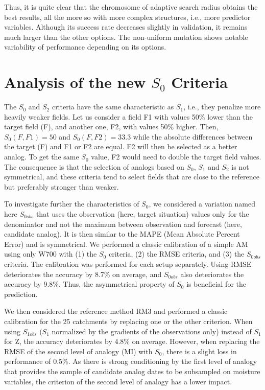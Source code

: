 \documentclass[draft]{agujournal2019}
\begin{document}
Thus, it is quite clear that the chromosome of adaptive search radius obtains the best results, all the more so with more complex structures, i.e., more predictor variables. Although its success rate decreases slightly in validation, it remains much larger than the other options. The non-uniform mutation shows notable variability of performance depending on its options.

\FloatBarrier

\section{Analysis of the new $S_{0}$ Criteria}

The $S_{0}$ and $S_{2}$ criteria have the same characteristic as $S_{1}$, i.e., they penalize more heavily weaker fields. Let us consider a field F1 with values 50\% lower than the target field (F), and another one, F2, with values 50\% higher. Then, $S_{0}(F, F1) = 50$ and $S_{0}(F, F2) = 33.3$ while the absolute differences between the target (F) and F1 or F2 are equal. F2 will then be selected as a better analog. To get the same $S_{0}$ value, F2 would need to double the target field values. The consequence is that the selection of analogs based on $S_{0}$, $S_{1}$ and $S_{2}$ is not symmetrical, and these criteria tend to select fields that are close to the reference but preferably stronger than weaker. 

To investigate further the characteristics of $S_{0}$, we considered a variation named here $S_{0obs}$ that uses the observation (here, target situation) values only for the denominator and not the maximum between observation and forecast (here, candidate analog). It is then similar to the MAPE (Mean Absolute Percent Error) and is symmetrical. We performed a classic calibration of a simple AM using only W700 with (1) the $S_{0}$ criteria, (2) the RMSE criteria, and (3) the $S_{0obs}$ criteria. The calibration was performed for each setup separately. Using RMSE deteriorates the accuracy by 8.7\% on average, and $S_{0obs}$ also deteriorates the accuracy by 9.8\%. Thus, the asymmetrical property of $S_{0}$ is beneficial for the prediction. 

We then considered the reference method RM3 and performed a classic calibration for the 25 catchments by replacing one or the other criterion. When using $S_{1obs}$ ($S_{1}$ normalized by the gradients of the observations only) instead of $S_{1}$ for Z, the accuracy deteriorates by 4.8\% on average. However, when replacing the RMSE of the second level of analogy (MI) with $S_{0}$, there is a slight loss in performance of 0.5\%. As there is strong conditioning by the first level of analogy that provides the sample of candidate analog dates to be subsampled on moisture variables, the criterion of the second level of analogy has a lower impact.
\end{document}

